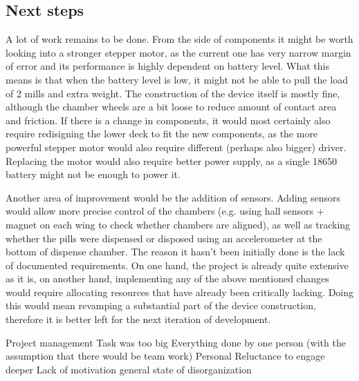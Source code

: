 \subsection{Next steps}
A lot of work remains to be done. From the side of components it might be worth looking into a stronger stepper motor, as the current one has very narrow margin of error and its performance is highly dependent on battery level. What this means is that when the battery level is low, it might not be able to pull the load of 2 mills and extra weight. The construction of the device itself is mostly fine, although the chamber wheels are a bit loose to reduce amount of contact area and friction. If there is a change in components, it would most certainly also require redisigning the lower deck to fit the new components, as the more powerful stepper motor would also require different (perhaps also bigger) driver.  Replacing the motor would also require better power supply, as a single 18650 battery might not be enough to power it. 

Another area of improvement would be the addition of sensors. Adding sensors would allow more precise control of the chambers (e.g. using hall sensors + magnet on each wing to check whether chambers are aligned), as well as tracking whether the pills were dispensed or disposed using an accelerometer at the bottom of dispense chamber.
The reason it hasn't been initially done is the lack of documented requirements. On one hand, the project is already quite extensive as it is, on another hand, implementing any of the above mentioned changes would require allocating resources that have already been critically lacking. Doing this would mean revamping a substantial part of the device construction, therefore it is better left for the next iteration of development.




Project management
	Task was too big
	Everything done by one person (with the assumption that there would be team work)	
Personal
	Reluctance to engage deeper
	Lack of motivation
	general state of disorganization
